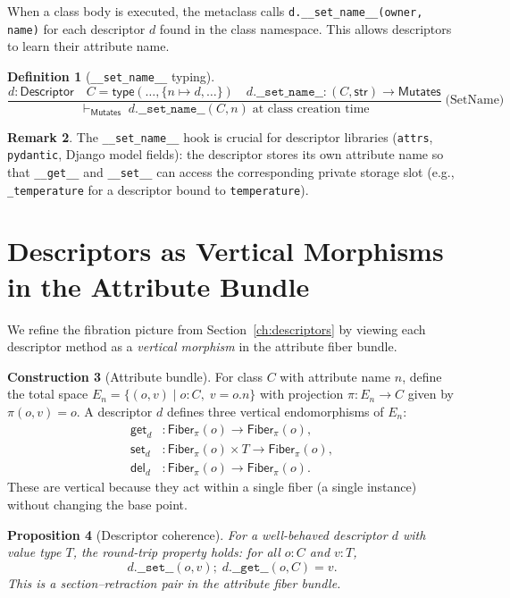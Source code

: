 \documentclass[11pt,a4paper]{report}
\theoremstyle{definition}
\newtheorem{definition}{Definition}[chapter]
\newtheorem{remark}[definition]{Remark}
\newtheorem{construction}[definition]{Construction}
\theoremstyle{plain}
\newtheorem{proposition}[definition]{Proposition}
\newcommand{\Mutates}{\mathsf{Mutates}}
\newcommand{\Fiber}{\mathsf{Fiber}}
\begin{document}
When a class body is executed, the metaclass calls
\texttt{d.\_\_set\_name\_\_(owner, name)} for each descriptor $d$ found in the
class namespace.  This allows descriptors to learn their attribute name.

\begin{definition}[\texttt{\_\_set\_name\_\_} typing]
\[
  \frac{
    d : \mathsf{Descriptor} \quad
    C = \mathsf{type}(\ldots, \{n \mapsto d, \ldots\}) \quad
    d.\texttt{\_\_set\_name\_\_} : (C, \mathsf{str}) \to \Mutates
  }{
    \vdash_{\Mutates}\; d.\texttt{\_\_set\_name\_\_}(C, n)
    \;\text{at class creation time}
  }
  \;\text{(SetName)}
\]
\end{definition}

\begin{remark}
The \texttt{\_\_set\_name\_\_} hook is crucial for descriptor libraries
(\texttt{attrs}, \texttt{pydantic}, Django model fields): the descriptor
stores its own attribute name so that \texttt{\_\_get\_\_} and
\texttt{\_\_set\_\_} can access the corresponding private storage slot
(e.g., \texttt{\_temperature} for a descriptor bound to \texttt{temperature}).
\end{remark}

\section{Descriptors as Vertical Morphisms in the Attribute Bundle}

We refine the fibration picture from Section~\ref{ch:descriptors}
by viewing each descriptor method as a \emph{vertical morphism} in the
attribute fiber bundle.

\begin{construction}[Attribute bundle]
For class $C$ with attribute name $n$, define the total space
$E_n = \{(o, v) \mid o : C,\; v = o.n\}$ with projection
$\pi : E_n \to C$ given by $\pi(o,v) = o$.  A descriptor $d$ defines
three vertical endomorphisms of $E_n$:
\begin{align*}
  \mathsf{get}_d &: \Fiber_\pi(o) \to \Fiber_\pi(o), \\
  \mathsf{set}_d &: \Fiber_\pi(o) \times T \to \Fiber_\pi(o), \\
  \mathsf{del}_d &: \Fiber_\pi(o) \to \Fiber_\pi(o).
\end{align*}
These are vertical because they act within a single fiber (a single instance)
without changing the base point.
\end{construction}

\begin{proposition}[Descriptor coherence]
For a well-behaved descriptor $d$ with value type $T$, the round-trip
property holds: for all $o : C$ and $v : T$,
\[
  d.\texttt{\_\_set\_\_}(o, v) ;\; d.\texttt{\_\_get\_\_}(o, C) = v.
\]
This is a section--retraction pair in the attribute fiber bundle.
\end{proposition}
\end{document}
